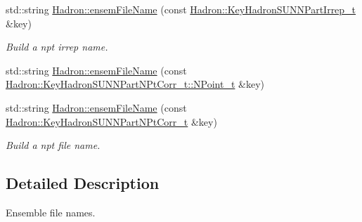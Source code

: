 \begin{DoxyCompactItemize}
std\+::string \mbox{\hyperlink{namespaceHadron_a45ea107463dbd2ccf4ceae63b851f861}{Hadron\+::ensem\+File\+Name}} (const \mbox{\hyperlink{structHadron_1_1KeyHadronSUNNPartIrrep__t}{Hadron\+::\+Key\+Hadron\+S\+U\+N\+N\+Part\+Irrep\+\_\+t}} \&key)
\begin{DoxyCompactList}\small\item\em Build a npt irrep name. \end{DoxyCompactList}\item 
std\+::string \mbox{\hyperlink{namespaceHadron_aa7a6f1af8bf69b8a63890e92bfaaf738}{Hadron\+::ensem\+File\+Name}} (const \mbox{\hyperlink{structHadron_1_1KeyHadronSUNNPartNPtCorr__t_1_1NPoint__t}{Hadron\+::\+Key\+Hadron\+S\+U\+N\+N\+Part\+N\+Pt\+Corr\+\_\+t\+::\+N\+Point\+\_\+t}} \&key)
\item 
std\+::string \mbox{\hyperlink{namespaceHadron_a535351e28134f75011451a8b7b5f7cb4}{Hadron\+::ensem\+File\+Name}} (const \mbox{\hyperlink{structHadron_1_1KeyHadronSUNNPartNPtCorr__t}{Hadron\+::\+Key\+Hadron\+S\+U\+N\+N\+Part\+N\+Pt\+Corr\+\_\+t}} \&key)
\begin{DoxyCompactList}\small\item\em Build a npt file name. \end{DoxyCompactList}\end{DoxyCompactItemize}


\subsection{Detailed Description}
Ensemble file names. 


